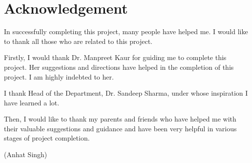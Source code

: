 \chapter*{Acknowledgement}

In successfully completing this project, many people have helped me. I would like to thank all those who are related to this project.

Firstly, I would thank Dr. Manpreet Kaur for guiding me to complete this project. Her suggestions and directions have helped in the completion of this project. I am highly indebted to her.

I thank Head of the Department, Dr. Sandeep Sharma, under whose inspiration I have learned a lot.

Then, I would like to thank my parents and friends who have helped me with their valuable suggestions and guidance and have been very helpful in various stages of project completion.
\vspace{2cm}

\begin{flushright}
(Anhat Singh)
\end{flushright}

\afterpage{\blankpage}